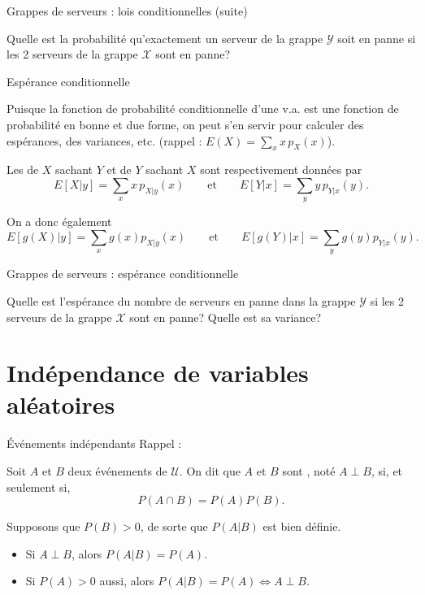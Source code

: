 \documentclass{BeamerTemplate}
\newcommand{\cibleReponse}{}
\newcommand{\lienreponse}[1]{\gdef\cibleReponse{#1}}
\begin{document}
\begin{frame}[t]{Grappes de serveurs : lois conditionnelles (suite)}

Quelle est la probabilité qu'exactement un serveur de la grappe $\mathcal{Y}$ soit en panne si les
2 serveurs de la grappe $\mathcal{X}$ sont en panne?

\lienreponse{rep-ex1}
\end{frame}


\begin{frame}[t]{Espérance conditionnelle}

{\small
 Puisque la fonction de probabilité conditionnelle d'une v.a. est une fonction de probabilité en
 bonne et due forme, on peut s'en servir pour calculer des espérances, des variances, etc.
 (rappel : $E(X)=\sum_x x\,p_X(x)$).

 \begin{defn}{}
   Les  de $X$ sachant $Y$ et de $Y$ sachant $X$ sont
   respectivement données par
   $$E[X|y]=\sum\limits_{x}x\,p_{X|y}(x) \qquad\text{et}\qquad E[Y|x]=\sum\limits_{y}y\,p_{Y|x}(y).$$
 \end{defn}

On a donc également
$$E[g(X)|y]=\sum\limits_{x}g(x)p_{X|y}(x) \qquad\text{et}\qquad E[g(Y)|x]=\sum\limits_{y}g(y)p_{Y|x}(y).$$
}

\end{frame}


\begin{frame}[t,label=exespcond]{Grappes de serveurs : espérance conditionnelle}

Quelle est l'espérance du nombre de serveurs en panne dans la grappe $\mathcal{Y}$ si les
2 serveurs de la grappe $\mathcal{X}$ sont en panne? Quelle est sa variance?

\lienreponse{rep-ex1}
\end{frame}

\section{Indépendance de variables aléatoires}

\begin{frame}[t]{Événements indépendants}
Rappel :
 \begin{defn}{}
  Soit $A$ et $B$ deux événements de $\mathcal{U}$. On dit que $A$ et $B$ sont
  , noté $A\perp B$, si, et seulement si,
  $$P(A\cap B) = P(A)P(B).$$
 \end{defn}

 Supposons que $P(B)>0$, de sorte que $P(A|B)$ est bien définie.
 \begin{itemize} \itemsep0.1in
  \item Si $A\perp B$, alors $P(A|B)=P(A)$.
  \item Si $P(A)>0$ aussi, alors $P(A|B)=P(A)\Leftrightarrow A\perp B$.
 \end{itemize}

\end{frame}
\end{document}
